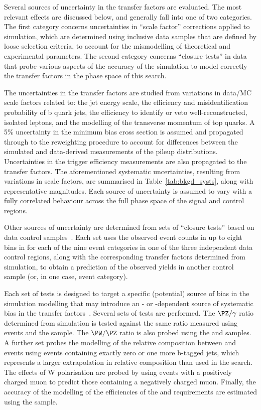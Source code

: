 Several sources of uncertainty in the transfer factors are evaluated.
The most relevant effects are discussed below, and generally fall into
one of two categories. The first category concerns uncertainties in
``scale factor'' corrections applied to simulation, which are
determined using inclusive data samples that are defined by loose
selection criteria, to account for the mismodelling of theoretical and
experimental parameters. The second category concerns ``closure
tests'' in data that probe various aspects of the accuracy of the
simulation to model correctly the transfer factors in the phase space
of this search.

The uncertainties in the transfer factors are studied from variations
in data/MC scale factors related to: the jet energy scale, the efficiency and
misidentification probability of b quark jets, the efficiency to
identify or veto well-reconstructed, isolated leptons, and the
modelling of the transverse momentum of top quarks. %
A 5\% uncertainty in the minimum bias cross section is assumed and
propagated through to the reweighting procedure to account for
differences between the simulated and data-derived measurements of the
pileup distributions.  Uncertainties in the trigger efficiency
measurements are also propagated to the transfer factors.  The
aforementioned systematic uncertainties, resulting from variations in
scale factors, are summarised in Table~\ref{tab:bkgd_systs}, along
with representative magnitudes.  Each source of uncertainty is assumed
to vary with a fully correlated behaviour across the full phase space
of the signal and control regions.

Other sources of uncertainty are determined from sets of ``closure tests''
based on data control samples~\cite{RA1Paper2012}. Each set uses the
observed event counts in up to eight bins in \scalht for each of the
nine \njet event categories in one of the three independent data
control regions, along with the corresponding transfer factors
determined from simulation, to obtain a prediction of the observed
yields in another control sample (or, in one case, \nb event
category).

Each set of tests is designed to target a specific (potential) source
of bias in the simulation modelling that may introduce an \njet- or
\scalht-dependent source of systematic bias in the transfer
factors~\cite{RA1Paper2012}. Several sets of tests are performed. The
$\PZ/\gamma$ ratio determined from simulation is tested against the
same ratio measured using \zmumuj events and the \gj sample. The
$\PW/\PZ$ ratio is also probed using the \mj and \mmj samples. A
further set probes the modelling of the relative composition between
\wlj and \ttbar events using \mj events containing exactly zero or
one more b-tagged jets, which represents a larger extrapolation in
relative composition than used in the search.  The effects of W
polarisation are probed by using \mj events with a positively charged
muon to predict those containing a negatively charged muon. Finally,
the accuracy of the modelling of the efficiencies of the \alphat and
\bdphi requirements are estimated using the \mj sample. 

